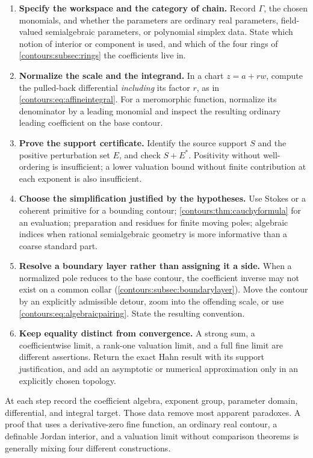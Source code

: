 \documentclass[11pt,letterpaper]{article}
\theoremstyle{definition}
\theoremstyle{remark}
\numberwithin{equation}{section}
\begin{document}
\begin{enumerate}
\item \textbf{Specify the workspace and the category of chain.} Record $\Gamma$, the
chosen monomials, and whether the parameters are ordinary real parameters,
field-valued semialgebraic parameters, or polynomial simplex data. State which
notion of interior or component is used, and which of the four rings of
\cref{contours:subsec:rings} the coefficients live in.
\item \textbf{Normalize the scale and the integrand.} In a chart $z=a+rw$, compute
the pulled-back differential \emph{including} its factor $r$, as in
\eqref{contours:eq:affineintegral}. For a meromorphic function, normalize its
denominator by a leading monomial and inspect the resulting ordinary leading
coefficient on the base contour.
\item \textbf{Prove the support certificate.} Identify the source support $S$ and the
positive perturbation set $E$, and check $S+E^*$. Positivity without well-ordering
is insufficient; a lower valuation bound without finite contribution at each
exponent is also insufficient.
\item \textbf{Choose the simplification justified by the hypotheses.} Use Stokes or
a coherent primitive for a bounding contour; \cref{contours:thm:cauchyformula} for an
evaluation; preparation and residues for finite moving poles; algebraic indices when
rational semialgebraic geometry is more informative than a coarse standard part.
\item \textbf{Resolve a boundary layer rather than assigning it a side.} When a
normalized pole reduces to the base contour, the coefficient inverse may not exist on
a common collar (\cref{contours:subsec:boundarylayer}). Move the contour by an
explicitly admissible detour, zoom into the offending scale, or use
\eqref{contours:eq:algebraicpairing}. State the resulting convention.
\item \textbf{Keep equality distinct from convergence.} A strong sum, a
coefficientwise limit, a rank-one valuation limit, and a full fine limit are
different assertions. Return the exact Hahn result with its support justification,
and add an asymptotic or numerical approximation only in an explicitly chosen
topology.
\end{enumerate}

At each step record the coefficient algebra, exponent group, parameter domain,
differential, and integral target. Those data remove most apparent paradoxes. A
proof that uses a derivative-zero fine function, an ordinary real contour, a
definable Jordan interior, and a valuation limit without comparison theorems is
generally mixing four different constructions.
\end{document}
